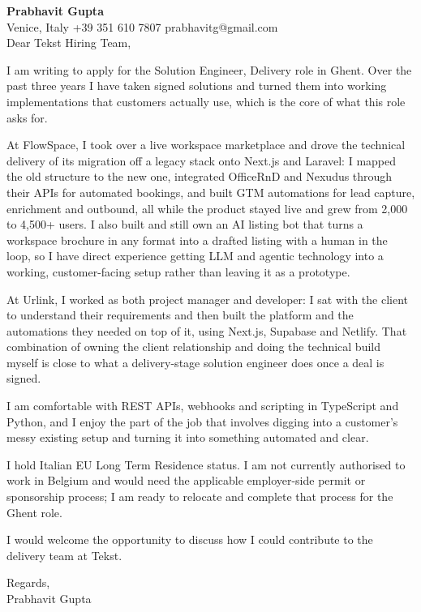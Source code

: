 \documentclass[a4paper,10.5pt]{article}
\begin{document}
\textbf{Prabhavit Gupta}\\
Venice, Italy \textbar{} +39 351 610 7807 \textbar{} prabhavitg@gmail.com\\[10pt]
Dear Tekst Hiring Team,

I am writing to apply for the Solution Engineer, Delivery role in Ghent. Over the past three years I have taken signed solutions and turned them into working implementations that customers actually use, which is the core of what this role asks for.

At FlowSpace, I took over a live workspace marketplace and drove the technical delivery of its migration off a legacy stack onto Next.js and Laravel: I mapped the old structure to the new one, integrated OfficeRnD and Nexudus through their APIs for automated bookings, and built GTM automations for lead capture, enrichment and outbound, all while the product stayed live and grew from 2,000 to 4,500+ users. I also built and still own an AI listing bot that turns a workspace brochure in any format into a drafted listing with a human in the loop, so I have direct experience getting LLM and agentic technology into a working, customer-facing setup rather than leaving it as a prototype.

At Urlink, I worked as both project manager and developer: I sat with the client to understand their requirements and then built the platform and the automations they needed on top of it, using Next.js, Supabase and Netlify. That combination of owning the client relationship and doing the technical build myself is close to what a delivery-stage solution engineer does once a deal is signed.

I am comfortable with REST APIs, webhooks and scripting in TypeScript and Python, and I enjoy the part of the job that involves digging into a customer's messy existing setup and turning it into something automated and clear.

I hold Italian EU Long Term Residence status. I am not currently authorised to work in Belgium and would need the applicable employer-side permit or sponsorship process; I am ready to relocate and complete that process for the Ghent role.

I would welcome the opportunity to discuss how I could contribute to the delivery team at Tekst.

Regards,\\
Prabhavit Gupta
\end{document}

